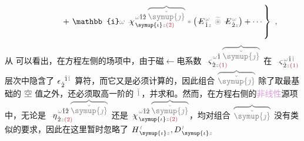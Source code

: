 \begin{subequations}
\begin{align}
	&~~~~~~~~~~~~~~~ +\left. \mathbb{i} \mathcolor{gray}{\omega} ~\Xint{{}^{}_{\mathcolor{gray}{-}}}{23}{\chi}^{\;\! \mathcolor{gray}{\omega} \hat{1} \hat{2} \;\! \mathcolor{gray}{\overbrace{\check{\symup{\jmath}}}}}_{\;\! \symup{\iota} \mathcolor{gray}{z} \textcolor{Maroon}{(2)}} \mathcolor{gray}{*} \left( \Xint{\mathcolor{gray}{-}}{295}{E}^{\;\!\mathcolor{gray}{\omega}}_{\;\! \hat{1} \mathcolor{gray}{z}} ~\mathcolor{gray}{\widetilde \circledast}~ \Xint{\mathcolor{gray}{-}}{295}{E}^{\;\!\mathcolor{gray}{\omega}}_{\;\! \hat{2} \mathcolor{gray}{z}} \right) + \cdots \right\}~,
\end{align}
\end{subequations}
从  可以看出，在方程左侧的场项中，由于\textcolor{NavyBlue}{磁$\longleftarrow$电}系数 $\Xint{\begin{smallmatrix} ~ \\ {}^{}_{\mathcolor{gray}{-}} \\ ~ \end{smallmatrix}}{13}{\varsigma}^{\;\! \mathcolor{gray}{\omega} \hat{1} \;\! \mathcolor{gray}{\overbrace{\check{\symup{\jmath}}}}}_{\;\! \dot{2} \mathcolor{gray}{z} \textcolor{Maroon}{(1)}}$ 在 $\Xint{\begin{smallmatrix} ~ \\ {}^{}_{\mathcolor{gray}{-}} \\ ~ \end{smallmatrix}}{13}{\varsigma}^{\;\! \mathcolor{gray}{\omega} \hat{1} \mathcolor{gray}{\check{1}}}_{\;\! \dot{2} \mathcolor{gray}{z} \textcolor{Maroon}{(1)}}$ 层次中隐含了 $\epsilon^{\;\! \hphantom{\dot{2}} \hat{1} \mathcolor{gray}{\check{1}}}_{\;\! \dot{2}}$ 算符，而它又是必须计算的，因此组合 $\mathcolor{gray}{\overbrace{\check{\symup{\jmath}}}}$ 除了取最基础的 \textcolor{gray}{空} 值之外，还必须取高一阶的 $\mathcolor{gray}{\check{1}}$，并求和。然而，在方程右侧的\textcolor{Plum}{非线性}源项中，无论是 $\Xint{\begin{smallmatrix} ~ \\ {}^{}_{\mathcolor{gray}{-}} \\ ~ \end{smallmatrix}}{17}{\eta}^{\;\! \mathcolor{gray}{\omega} \hat{1} \hat{2} \;\! \mathcolor{gray}{\overbrace{\check{\symup{\jmath}}}}}_{\;\! \dot{2} \mathcolor{gray}{z} \textcolor{Maroon}{(2)}}$ 还是 $\Xint{{}^{}_{\mathcolor{gray}{-}}}{23}{\chi}^{\;\! \mathcolor{gray}{\omega} \hat{1} \hat{2} \;\! \mathcolor{gray}{\overbrace{\check{\symup{\jmath}}}}}_{\;\! \symup{\iota} \mathcolor{gray}{z} \textcolor{Maroon}{(2)}}$，均对组合 $\mathcolor{gray}{\overbrace{\check{\symup{\jmath}}}}$ 没有类似的要求，因此在这里暂时忽略了 $H^{\;\!\mathcolor{gray}{t}}_{\;\! \symup{\iota}\mathcolor{gray}{z}}, D^{\;\!\mathcolor{gray}{t}}_{\;\! \symup{\iota}\mathcolor{gray}{z}}$ 